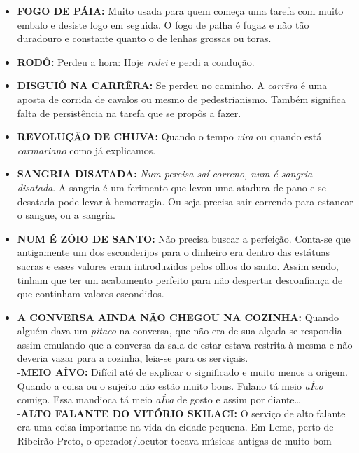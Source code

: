 \documentclass[12pt,brazil,]{book}
\providecommand{\tightlist}{%
  \setlength{\itemsep}{0pt}\setlength{\parskip}{0pt}}
\begin{document}
\begin{itemize}
\tightlist
\item
  \textbf{FOGO DE PÁIA:} Muito usada para quem começa uma tarefa com
  muito embalo e desiste logo em seguida. O fogo de palha é fugaz e não
  tão duradouro e constante quanto o de lenhas grossas ou toras.\\
\item
  \textbf{RODÔ:} Perdeu a hora: Hoje \emph{rodei} e perdi a condução.\\
\item
  \textbf{DISGUIÔ NA CARRÊRA:} Se perdeu no caminho. A \emph{carrêra} é
  uma aposta de corrida de cavalos ou mesmo de pedestrianismo. Também
  significa falta de persistência na tarefa que se propôs a fazer.\\
\item
  \textbf{REVOLUÇÃO DE CHUVA:} Quando o tempo \emph{vira} ou quando está
  \emph{carmariano} como já explicamos.\\
\item
  \textbf{SANGRIA DISATADA:} \emph{Num percisa saí correno, num é
  sangria disatada}. A sangria é um ferimento que levou uma atadura de
  pano e se desatada pode levar à hemorragia. Ou seja precisa sair
  correndo para estancar o sangue, ou a sangria.\\
\item
  \textbf{NUM É ZÓIO DE SANTO:} Não precisa buscar a perfeição. Conta-se
  que antigamente um dos esconderijos para o dinheiro era dentro das
  estátuas sacras e esses valores eram introduzidos pelos olhos do
  santo. Assim sendo, tinham que ter um acabamento perfeito para não
  despertar desconfiança de que continham valores escondidos.\\
\item
  \textbf{A CONVERSA AINDA NÃO CHEGOU NA COZINHA:} Quando alguém dava um
  \emph{pitaco} na conversa, que não era de sua alçada se respondia
  assim emulando que a conversa da sala de estar estava restrita à mesma
  e não deveria vazar para a cozinha, leia-se para os serviçais.\\
  -\textbf{MEIO AÍVO:} Difícil até de explicar o significado e muito
  menos a origem. Quando a coisa ou o sujeito não estão muito bons.
  Fulano tá meio \emph{aÍvo} comigo. Essa mandioca tá meio \emph{aÍva}
  de gosto e assim por diante\ldots{}\\
  -\textbf{ALTO FALANTE DO VITÓRIO SKILACI:} O serviço de alto falante
  era uma coisa importante na vida da cidade pequena. Em Leme, perto de
  Ribeirão Preto, o operador/locutor tocava músicas antigas de muito bom

\end{itemize}
\end{document}
